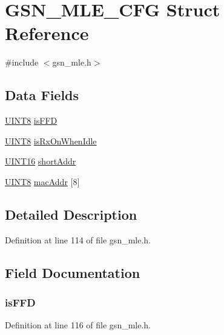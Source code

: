 \hypertarget{a00150}{
\section{GSN\_\-MLE\_\-CFG Struct Reference}
\label{a00150}
}


{\ttfamily \#include $<$gsn\_\-mle.h$>$}

\subsection*{Data Fields}
\begin{DoxyCompactItemize}
\item 
\hyperlink{a00660_gab27e9918b538ce9d8ca692479b375b6a}{UINT8} \hyperlink{a00150_acd45cd34b3167dd740cc7efa438b795b}{isFFD}
\item 
\hyperlink{a00660_gab27e9918b538ce9d8ca692479b375b6a}{UINT8} \hyperlink{a00150_a8ddbcf3bf06d5167eb53d0c005908021}{isRxOnWhenIdle}
\item 
\hyperlink{a00660_ga09f1a1fb2293e33483cc8d44aefb1eb1}{UINT16} \hyperlink{a00150_a9b19e8e3387061f7498579b37cdbabdf}{shortAddr}
\item 
\hyperlink{a00660_gab27e9918b538ce9d8ca692479b375b6a}{UINT8} \hyperlink{a00150_a50588254dfbe5049265b792e1cab13c2}{macAddr} \mbox{[}8\mbox{]}
\end{DoxyCompactItemize}


\subsection{Detailed Description}


Definition at line 114 of file gsn\_\-mle.h.



\subsection{Field Documentation}
\hypertarget{a00150_acd45cd34b3167dd740cc7efa438b795b}{
\subsubsection[{isFFD}]{ {\bf isFFD}}}
\label{a00150_acd45cd34b3167dd740cc7efa438b795b}


Definition at line 116 of file gsn\_\-mle.h.

